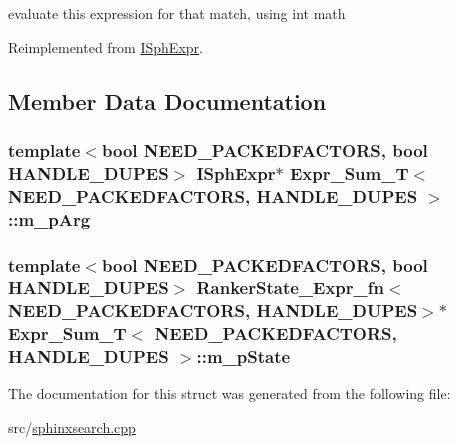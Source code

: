 evaluate this expression for that match, using int math 



Reimplemented from \hyperlink{structISphExpr_a32fb4380bed5d788ce29c0c659b2e917}{I\-Sph\-Expr}.



\subsection{Member Data Documentation}
\hypertarget{structExpr__Sum__T_a41a00ec1616ae89c76a303a28821e1e6}{
\subsubsection[{m\-\_\-p\-Arg}]{\setlength{\rightskip}{0pt plus 5cm}template$<$bool N\-E\-E\-D\-\_\-\-P\-A\-C\-K\-E\-D\-F\-A\-C\-T\-O\-R\-S, bool H\-A\-N\-D\-L\-E\-\_\-\-D\-U\-P\-E\-S$>$ {\bf I\-Sph\-Expr}$\ast$ {\bf Expr\-\_\-\-Sum\-\_\-\-T}$<$ N\-E\-E\-D\-\_\-\-P\-A\-C\-K\-E\-D\-F\-A\-C\-T\-O\-R\-S, H\-A\-N\-D\-L\-E\-\_\-\-D\-U\-P\-E\-S $>$\-::m\-\_\-p\-Arg}}\label{structExpr__Sum__T_a41a00ec1616ae89c76a303a28821e1e6}
\hypertarget{structExpr__Sum__T_a3ac75c61ee084a38756ef3695840e4ef}{
\subsubsection[{m\-\_\-p\-State}]{\setlength{\rightskip}{0pt plus 5cm}template$<$bool N\-E\-E\-D\-\_\-\-P\-A\-C\-K\-E\-D\-F\-A\-C\-T\-O\-R\-S, bool H\-A\-N\-D\-L\-E\-\_\-\-D\-U\-P\-E\-S$>$ {\bf Ranker\-State\-\_\-\-Expr\-\_\-fn}$<$N\-E\-E\-D\-\_\-\-P\-A\-C\-K\-E\-D\-F\-A\-C\-T\-O\-R\-S, H\-A\-N\-D\-L\-E\-\_\-\-D\-U\-P\-E\-S$>$$\ast$ {\bf Expr\-\_\-\-Sum\-\_\-\-T}$<$ N\-E\-E\-D\-\_\-\-P\-A\-C\-K\-E\-D\-F\-A\-C\-T\-O\-R\-S, H\-A\-N\-D\-L\-E\-\_\-\-D\-U\-P\-E\-S $>$\-::m\-\_\-p\-State}}\label{structExpr__Sum__T_a3ac75c61ee084a38756ef3695840e4ef}


The documentation for this struct was generated from the following file\-:\begin{DoxyCompactItemize}
\item 
src/\hyperlink{sphinxsearch_8cpp}{sphinxsearch.\-cpp}\end{DoxyCompactItemize}
